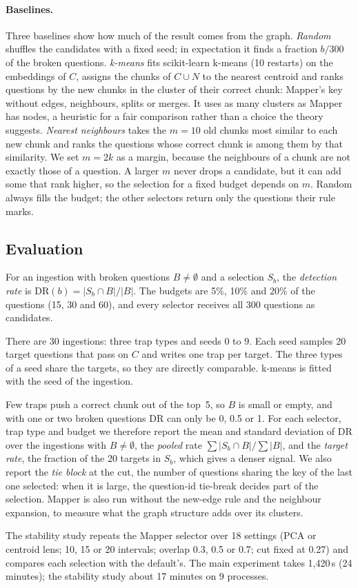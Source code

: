 \paragraph{Baselines.}
Three baselines show how much of the result comes from the graph.
\emph{Random} shuffles the candidates with a fixed seed; in expectation it
finds a fraction $b/300$ of the broken questions. \emph{k-means} fits
scikit-learn k-means (10 restarts) on the embeddings of $C$, assigns the
chunks of $C \cup N$ to the nearest centroid and ranks questions by the new
chunks in the cluster of their correct chunk: Mapper's key without edges,
neighbours, splits or merges. It uses as many clusters as Mapper has nodes,
a heuristic for a fair comparison rather than a choice the theory suggests.
\emph{Nearest neighbours} takes the $m = 10$ old chunks most similar to each
new chunk and ranks the questions whose correct chunk is among them by that
similarity. We set $m = 2k$ as a margin, because the neighbours of a chunk
are not exactly those of a question. A larger $m$ never drops a candidate,
but it can add some that rank higher, so the selection for a fixed budget
depends on $m$. Random always fills the budget; the other selectors return
only the questions their rule marks.

\subsection{Evaluation}
\label{sec:method-evaluation}

For an ingestion with broken questions $B \neq \emptyset$ and a selection
$S_b$, the \emph{detection rate} is
$\mathrm{DR}(b) = |S_b \cap B| / |B|$. The budgets are 5\%, 10\% and 20\% of
the questions (15, 30 and 60), and every selector receives all 300 questions as candidates.

There are 30 ingestions: three trap types and seeds 0 to 9. Each seed
samples 20 target questions that pass on $C$ and writes one trap per target.
The three types of a seed share the targets, so they are directly
comparable. k-means is fitted with the seed of the ingestion.

Few traps push a correct chunk out of the top~5, so $B$ is small or empty,
and with one or two broken questions $\mathrm{DR}$ can only be 0, 0.5 or 1.
For each selector, trap type and budget we therefore report the mean and
standard deviation of $\mathrm{DR}$ over the ingestions with
$B \neq \emptyset$, the \emph{pooled} rate $\sum |S_b \cap B| / \sum |B|$,
and the \emph{target rate}, the fraction of the 20 targets in $S_b$, which
gives a denser signal. We also report the \emph{tie block} at the cut, the
number of questions sharing the key of the last one selected: when it is
large, the question-id tie-break decides part of the selection. Mapper is
also run without the new-edge rule and the neighbour expansion, to measure
what the graph structure adds over its clusters.

The stability study repeats the Mapper selector over 18 settings (PCA or
centroid lens; 10, 15 or 20 intervals; overlap 0.3, 0.5 or 0.7; cut fixed at
0.27) and compares each selection with the default's. The main experiment
takes 1,420\,s (24 minutes); the stability study about 17 minutes on
9 processes.
